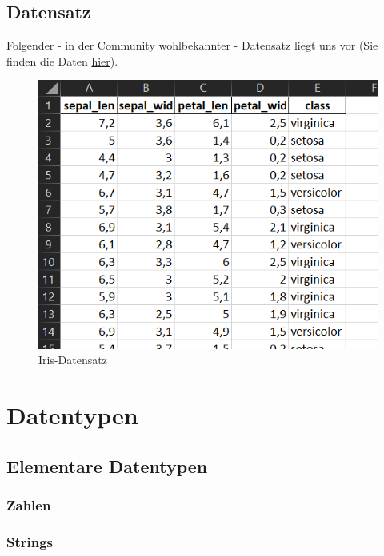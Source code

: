 \documentclass[
  oneside]{book}
\theoremstyle{definition}
\theoremstyle{definition}
\theoremstyle{definition}
\theoremstyle{definition}
\theoremstyle{remark}
\begin{document}
\hypertarget{datensatz}{%
\subsection{Datensatz}\label{datensatz}}

Folgender - in der Community wohlbekannter - Datensatz liegt uns vor (Sie finden die Daten \href{https://syncandshare.lrz.de/getlink/fi89kxTJ5yLRaW5mnpyrofVK/Iris_p.xlsx}{hier}).

\begin{figure}
\centering
\includegraphics{assets/daten.assets/image-20211209101425856-16426070878651.png}
\caption{Iris-Datensatz}
\end{figure}

\hypertarget{datentypen}{%
\section{Datentypen}\label{datentypen}}

\hypertarget{elementare-datentypen}{%
\subsection{Elementare Datentypen}\label{elementare-datentypen}}

\hypertarget{zahlen}{%
\subsubsection{Zahlen}\label{zahlen}}

\hypertarget{strings}{%
\subsubsection{Strings}\label{strings}}
\end{document}
